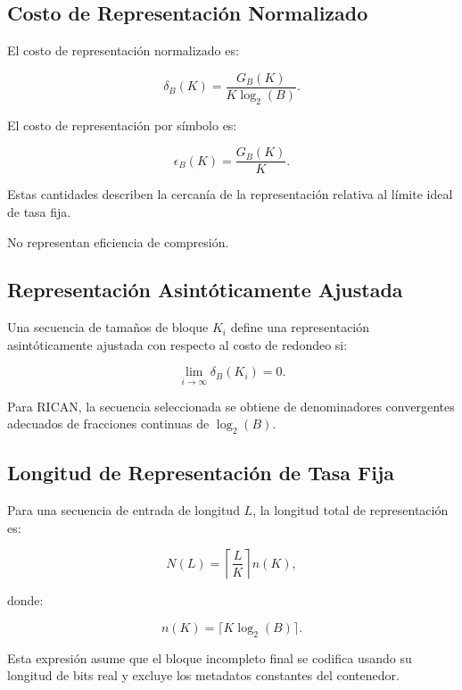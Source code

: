 \documentclass[onecolumn]{IEEEtran}
\begin{document}
\subsection{Costo de Representación Normalizado}

\begin{definition}

El costo de representación normalizado es:

\[
\delta_B(K)
=
\frac{G_B(K)}
{K\log_2(B)} .
\]

El costo de representación por símbolo es:

\[
\epsilon_B(K)
=
\frac{G_B(K)}{K}.
\]

Estas cantidades describen la cercanía de la representación relativa
al límite ideal de tasa fija.

No representan eficiencia de compresión.

\end{definition}

\subsection{Representación Asintóticamente Ajustada}

\begin{definition}

Una secuencia de tamaños de bloque $K_i$ define una representación
asintóticamente ajustada con respecto al costo de redondeo si:

\[
\lim_{i\rightarrow\infty}
\delta_B(K_i)=0 .
\]

Para RICAN, la secuencia seleccionada se obtiene de denominadores
convergentes adecuados de fracciones continuas de $\log_2(B)$.

\end{definition}

\subsection{Longitud de Representación de Tasa Fija}

Para una secuencia de entrada de longitud $L$, la longitud total de
representación es:

\[
N(L)=
\left\lceil\frac{L}{K}\right\rceil n(K),
\]

donde:

\[
n(K)=\lceil K\log_2(B)\rceil .
\]

Esta expresión asume que el bloque incompleto final se codifica
usando su longitud de bits real y excluye los metadatos constantes
del contenedor.
\end{document}
